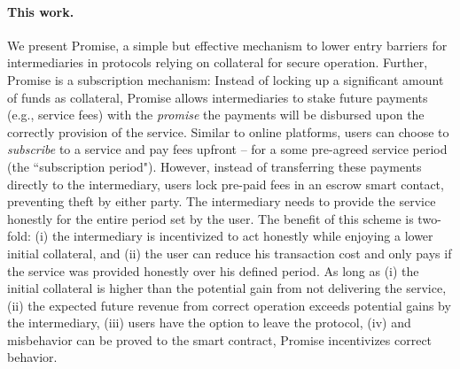 \documentclass[runningheads]{llncs}
\newcommand{\sys}{Promise\xspace}
\begin{document}
\paragraph{This work.}
We present \sys, a simple but effective mechanism to lower entry barriers for intermediaries in protocols relying on collateral for secure operation.
Further, \sys is a subscription mechanism:
Instead of locking up a significant amount of funds as collateral, \sys allows intermediaries to stake future payments (e.g., service fees) with the \textit{promise} the payments will be disbursed upon the correctly provision of the service.
Similar to online platforms, users can choose to \textit{subscribe} to a service and pay fees upfront -- for a some pre-agreed service period (the ``subscription period").
However, instead of transferring these payments directly to the intermediary, users lock pre-paid fees in an escrow smart contact, preventing theft by either party. 
The intermediary needs to provide the service honestly for the entire period set by the user.
The benefit of this scheme is two-fold: (i) the intermediary is incentivized to act honestly while enjoying a lower initial collateral, and (ii) the user can reduce his transaction cost and only pays if the service was provided honestly over his defined period. %
As long as (i) the initial collateral is higher than the potential gain from not delivering the service, (ii) the expected future revenue from correct operation exceeds potential gains by the intermediary, (iii) users have the option to leave the protocol, (iv) and misbehavior can be proved to the smart contract, \sys incentivizes correct behavior.
\end{document}
